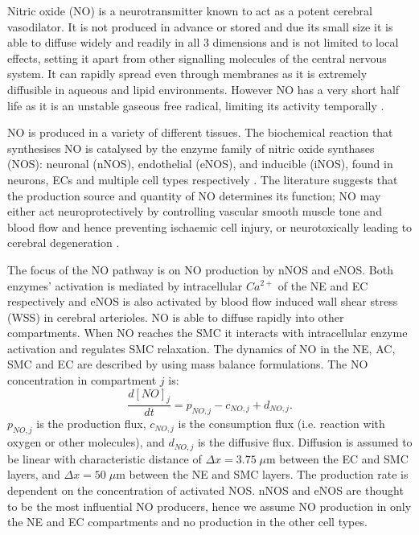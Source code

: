 		Nitric oxide (NO) is a neurotransmitter known to act as a potent cerebral vasodilator. It is not produced in advance or stored and due its small size it is able to diffuse widely and readily in all 3 dimensions and is not limited to local effects, setting it apart from other signalling molecules of the central nervous system. It can rapidly spread even through membranes as it is extremely diffusible in aqueous and lipid environments. However NO has a very short half life as it is an unstable gaseous free radical, limiting its activity temporally \citep{Dobutovic2011} . 
					
		NO is produced in a variety of different tissues. The biochemical reaction that synthesises NO is catalysed by the enzyme family of nitric oxide synthases (NOS): neuronal (nNOS), endothelial (eNOS), and inducible (iNOS), found in neurons, ECs and multiple cell types respectively \citep{Foerstermann2006}. 
		The literature suggests that the production source and quantity of NO determines its function; NO may either act neuroprotectively by controlling vascular smooth muscle tone and blood flow and hence preventing ischaemic cell injury, or neurotoxically leading to cerebral degeneration \citep{Zorrilla-Zubilete2010}.
				
		The focus of the NO pathway is on NO production by nNOS and eNOS. Both enzymes' activation is mediated by intracellular $Ca^{2+}$ of the NE and EC respectively and eNOS is also activated by blood flow induced wall shear stress (WSS) in cerebral arterioles.
		NO is able to diffuse rapidly into other compartments. When NO reaches the SMC it interacts with intracellular enzyme activation and regulates SMC relaxation. 
		The dynamics of NO in the NE, AC, SMC and EC are described by using mass balance formulations. The NO concentration in compartment $j$ is:
			\begin{equation}
			\frac{d[NO]_j}{dt} = p_{NO,j} - c_{NO,j} + d_{NO,j}.
			\end{equation}
		$ p_{NO,j}$ is the production flux,  $c_{NO,j}$ is the consumption flux (i.e. reaction with oxygen or other molecules), and $d_{NO,j}$ is the diffusive flux. Diffusion is assumed to be linear with characteristic distance of $\Delta x = 3.75 \; \mu$m between the EC and SMC layers, and  $\Delta x = 50 \; \mu$m between the NE and SMC layers.
		The production rate is dependent on the concentration of activated NOS. nNOS and eNOS are thought to be the most influential NO producers, hence we assume NO production in only the NE and EC compartments and no production in the other cell types.
		

